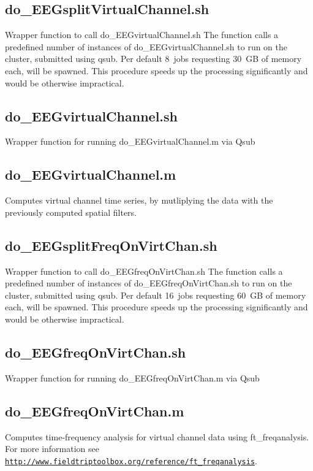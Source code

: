 \documentclass[12pt,a4paper]{scrartcl}
\begin{document}
\subsection{do\_EEGsplitVirtualChannel.sh}
\label{sec:virtch}
Wrapper function to call do\_EEGvirtualChannel.sh The function calls a predefined number of instances of do\_EEGvirtualChannel.sh to run on the cluster, submitted using qsub. Per default 8~jobs requesting 30~GB of memory each, will be spawned. This procedure speeds up the processing significantly and would be otherwise impractical.\\

\subsection{do\_EEGvirtualChannel.sh}
Wrapper function for running do\_EEGvirtualChannel.m via Qsub

\subsection{do\_EEGvirtualChannel.m}
Computes virtual channel time series, by mutliplying the data with the previously computed spatial filters.

\subsection{do\_EEGsplitFreqOnVirtChan.sh}
\label{sec:freqVirt}
Wrapper function to call do\_EEGfreqOnVirtChan.sh The function calls a predefined number of instances of do\_EEGfreqOnVirtChan.sh to run on the cluster, submitted using qsub. Per default 16~jobs requesting 60~GB of memory each, will be spawned. This procedure speeds up the processing significantly and would be otherwise impractical.\\

\subsection{do\_EEGfreqOnVirtChan.sh}
Wrapper function for running do\_EEGfreqOnVirtChan.m via Qsub

\subsection{do\_EEGfreqOnVirtChan.m}
Computes time-frequency analysis for virtual channel data using ft\_freqanalysis. For more information see \href{http://www.fieldtriptoolbox.org/reference/ft\_freqanalysis}{\nolinkurl{http://www.fieldtriptoolbox.org/reference/ft\_freqanalysis}}.
\end{document}
